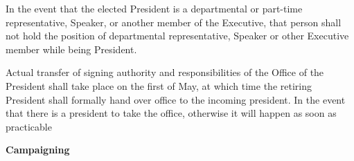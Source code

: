 \begin{longenum}[ label*=\thesection.\arabic*., align=left]
\begin{longenum}[label*=\arabic*., align=left]
  \item In the event that the elected President is a departmental or part-time representative, Speaker, or another member of the Executive, that person shall not hold the position of departmental representative, Speaker or other Executive member while being President.
  \item Actual transfer of signing authority and responsibilities of the Office of the President shall take place on the first of May, at which time the retiring President shall formally hand over office to the incoming president. In the event that there is a president to take the office, otherwise it will happen as soon as practicable
  
 \end{longenum}
 \item \textbf{Campaigning}
  \begin{longenum}[label*=\arabic*., align=left]
 

\end{longenum}
\end{longenum}

